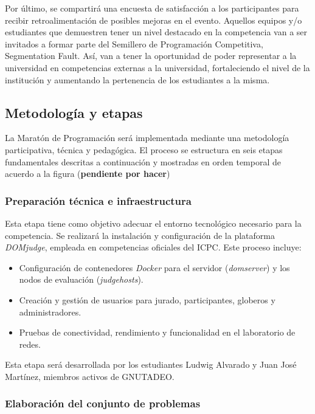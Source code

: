 \documentclass{article}
\begin{document}
Por último, se compartirá una encuesta de satisfacción a los participantes para recibir retroalimentación de posibles mejoras en el evento. Aquellos equipos y/o estudiantes que demuestren tener un nivel destacado en la competencia van a ser invitados a formar parte del Semillero de Programación Competitiva, Segmentation Fault. Así, van a tener la oportunidad de poder representar a la universidad en competencias externas a la universidad, fortaleciendo el nivel de la institución y aumentando la pertenencia de los estudiantes a la misma.


\subsection{Metodología y etapas}

La Maratón de Programación será implementada mediante una metodología participativa, técnica y pedagógica. El proceso se estructura en seis etapas fundamentales descritas a continuación y mostradas en orden temporal de acuerdo a la figura (\textbf{pendiente por hacer})

\subsubsection{Preparación técnica e infraestructura}

Esta etapa tiene como objetivo adecuar el entorno tecnológico necesario para la competencia. Se realizará la instalación y configuración de la plataforma \textit{DOMjudge}, empleada en competencias oficiales del ICPC. Este proceso incluye:

\begin{itemize}
  \item Configuración de contenedores \textit{Docker} para el servidor (\textit{domserver}) y los nodos de evaluación (\textit{judgehosts})\cite{domjudge-domserver,domjudge-judgehost}.
  \item Creación y gestión de usuarios para jurado, participantes, globeros y administradores.
  \item Pruebas de conectividad, rendimiento y funcionalidad en el laboratorio de redes.
\end{itemize}

Esta etapa será desarrollada por los estudiantes Ludwig Alvarado y Juan José Martínez, miembros activos de GNUTADEO.

\subsubsection{Elaboración del conjunto de problemas}
\end{document}
